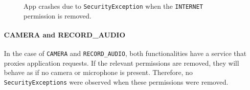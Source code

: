 \begin{figure}[t]
\centerline{}
\caption{App crashes due to \texttt{SecurityException} when the \texttt{INTERNET} permission is removed.}
\label{fig:crash}
\end{figure}

\paragraph{{\bfseries \ttfamily CAMERA} and {\bfseries \ttfamily RECORD\_AUDIO}}
In the case of \texttt{CAMERA} and \texttt{RECORD\_AUDIO}, both functionalities have a service that proxies application requests.  If the relevant permissions are removed, they will behave as if no camera or microphone is present.  Therefore, no \texttt{SecurityExceptions} were observed when these permissions were removed.

